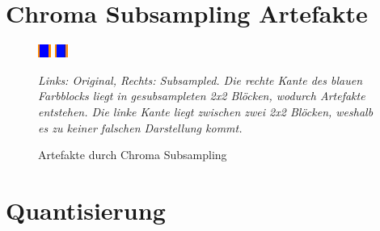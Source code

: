 \begin{appendices}
\chapter{Chroma Subsampling Artefakte}
\label{appendix:subsampling_artefacts}
\begin{figure}[h!]
    \centering
    \includegraphics[scale=10]{images/2-1_chroma_artefacts_original.png}
    \includegraphics[scale=10]{images/2-1_chroma_artefacts_sampled.png}
    \caption{Artefakte durch Chroma Subsampling}
    \textit{Links: Original, Rechts: Subsampled. Die rechte Kante des blauen Farbblocks liegt in gesubsampleten 2x2 Blöcken, wodurch Artefakte entstehen. Die linke Kante liegt zwischen zwei 2x2 Blöcken, weshalb es zu keiner falschen Darstellung kommt.}
    \label{fig:chroma_artefacts}
\end{figure}

\chapter{Quantisierung}
\label{appendix:qauntisierung}


\end{appendices}
